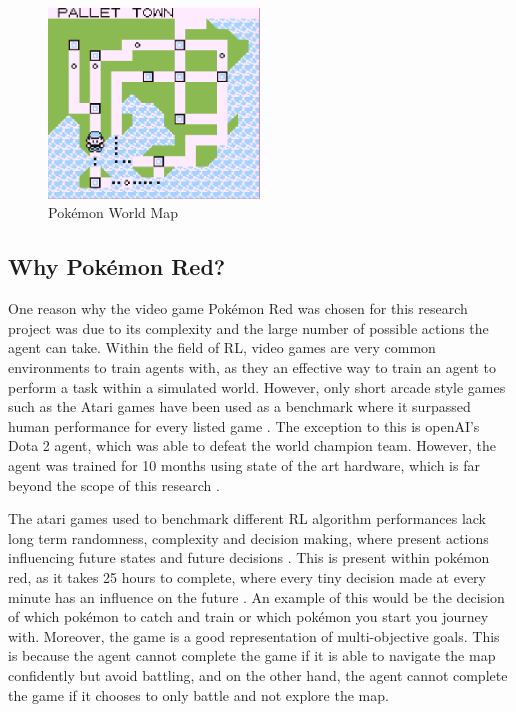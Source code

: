 \begin{figure}[H]
    \centering
    \includegraphics[width=0.5\textwidth]{figures/red_map.png}
    \caption{Pokémon World Map}
    \label{fig:pkmn_map}
\end{figure}

\subsection{Why Pokémon Red?}

One reason why the video game Pokémon Red was chosen for this research project was due to its complexity and the large number of possible actions the agent can take. Within the field of RL, video games are very common environments to train agents with, as they an effective way to train an agent to perform a task within a simulated world. However, only short arcade style games such as the Atari games have been used as a benchmark where it surpassed human performance for every listed game \cite{brockman2016openai}. The exception to this is openAI's Dota 2 agent, which was able to defeat the world champion team. However, the agent was trained for 10 months using state of the art hardware, which is far beyond the scope of this research \cite{berner2019dota}.

The atari games used to benchmark different RL algorithm performances lack long term randomness, complexity and decision making, where present actions influencing future states and future decisions \cite{brockman2016openai}. This is present within pokémon red, as it takes 25 hours to complete, where every tiny decision made at every minute has an influence on the future \cite{howlongtobeat}. An example of this would be the decision of which pokémon to catch and train or which pokémon you start you journey with. Moreover, the game is a good representation of multi-objective goals. This is because the agent cannot complete the game if it is able to navigate the map confidently but avoid battling, and on the other hand, the agent cannot complete the game if it chooses to only battle and not explore the map.

